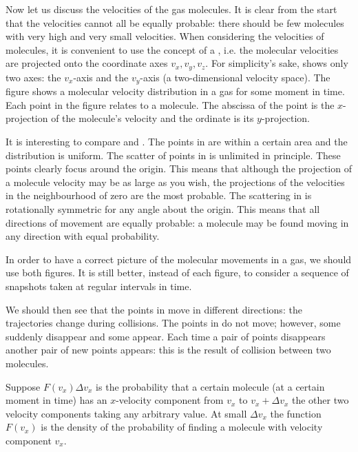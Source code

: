 Now let us discuss the velocities of the gas molecules. It is clear from the start that the velocities cannot all be equally probable: there should be few molecules with very high and very small velocities. When considering the velocities of molecules, it is convenient to use the concept of a , i.e. the molecular velocities are projected onto the coordinate axes $v_{x}, v_{y}, v_{z}$. For simplicity's sake,  shows only two axes: the $v_{x}$-axis and the $v_{y}$-axis (a two-dimensional velocity space). The figure shows a molecular velocity distribution in a gas for some moment in time. Each point in the figure relates to a molecule. The abscissa of the point is the $x$-projection of the molecule's velocity and the ordinate is its $y$-projection.

It is interesting to compare  and . The points in  are within a certain area and the distribution is uniform. The scatter of points in  is unlimited in principle. These points clearly focus around the origin. This means that although the projection of a molecule velocity may be as large as you wish, the projections of the velocities in the neighbourhood of zero are the most probable. The scattering in  is rotationally symmetric for any angle about the origin. This means that all directions of movement are equally probable: a molecule may be found moving in any direction with equal probability.

In order to have a correct picture of the molecular movements in a gas, we should use both figures. It is still better, instead of each figure, to consider a sequence of snapshots taken at regular intervals in time.

We should then see that the points in   move in different directions: the trajectories change during collisions. The points in  do not move; however, some suddenly disappear and some appear. Each time a pair of points disappears another pair of new points appears: this is the result of collision between two molecules.

 Suppose $F  (v_{x}) \Delta v_{x}$ is the probability that a certain molecule (at a certain moment in time) has an $x$-velocity component	from	 $v_{x}$	to	$v_{x} + \Delta v_{x}$	the	other two	velocity components taking any arbitrary value. At small $\Delta v_{x}$ the function $F  (v_{x})$ is the density of the probability of finding a molecule with velocity component $v_{x}$.

